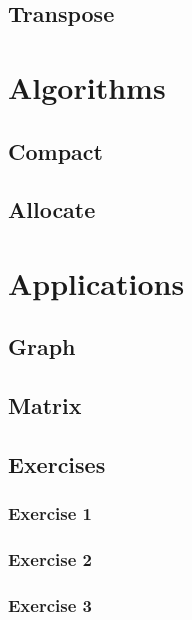 \documentclass[12px,oz]{report}
\begin{document}
	\section{Transpose}
	\label{sec-transpose}
	
	
\chapter{Algorithms}
\label{ch-algorithms}


	\section{Compact}
	\label{sec-compact}
	
	
	\section{Allocate}
	\label{sec-allocate}
	

\chapter{Applications}
\label{ch-app}

	\section{Graph}
	\label{sec-graph}
	
	
	\section{Matrix}
	\label{sec-matrix}
	
	
	\section{Exercises}
	
		\subsection{Exercise 1}
		
		\subsection{Exercise 2}
		
		\subsection{Exercise 3}
		
\end{document}
